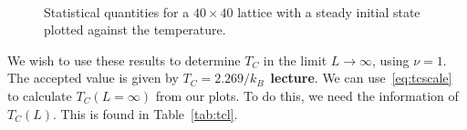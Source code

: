 \documentclass[12pt]{article}
\numberwithin{equation}{section}
\begin{document}
\begin{figure}[h]
\begin{center}
 \\
\caption{Statistical quantities for a $40\times40$ lattice with a steady initial state plotted against the temperature.}
\label{fig:latsize40}
\end{center}
\end{figure}

\par We wish to use these results to determine $T_{C}$ in the limit $L\rightarrow\infty$, using $\nu=1$.  The accepted value is given by $T_{C}=2.269/k_{B}$~\textbf{lecture}.    We can use~\eqref{eq:tcscale} to calculate $T_{C}(L=\infty)$ from our plots.  To do this, we need the information of $T_{C}(L)$.  This is found in Table~\ref{tab:tcl}. 
\end{document}
